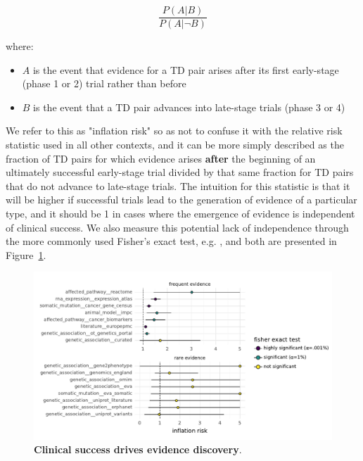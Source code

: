 \documentclass{article}
\begin{document}
\begin{equation}
  \frac{P(A | B)}{P(A | \neg B)}
\end{equation}

where:

\begin{itemize}
\item \(A\) is the event that evidence for a TD pair arises after its first early-stage (phase 1 or 2) trial rather than before
\item \(B\) is the event that a TD pair advances into late-stage trials (phase 3 or 4)
\end{itemize}

We refer to this as "inflation risk" so as not to confuse it with the relative risk statistic used in all other contexts, and it can be more simply described as the fraction of TD pairs for which evidence arises \textbf{after} the beginning of an ultimately successful early-stage trial divided by that same fraction for TD pairs that do not advance to late-stage trials. The intuition for this statistic is that it will be higher if successful trials lead to the generation of evidence of a particular type, and it should be 1 in cases where the emergence of evidence is independent of clinical success. We also measure this potential lack of independence through the more commonly used Fisher's exact test, e.g. \cite{PMID:19725948}, and both are presented in Figure~\ref{fig:evidence_inflation}.

\begin{figure}[!htb]
  \centering
  \captionsetup{width=.9\linewidth}
  \includegraphics[width=1\textwidth]{evidence_inflation.pdf}
  \caption{
    \textbf{Clinical success drives evidence discovery}.  
  }
  \label{fig:evidence_inflation}
\end{figure}
\end{document}
